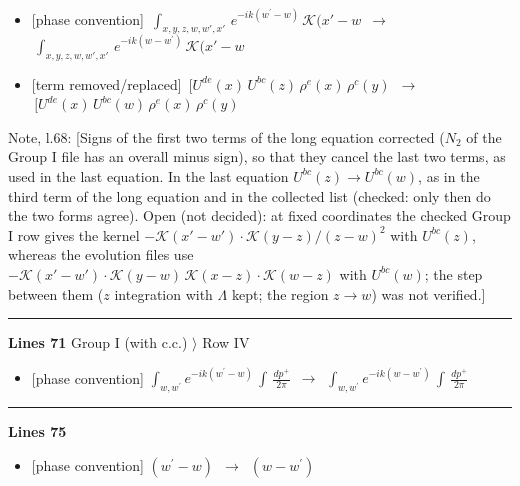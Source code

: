 \documentclass[10pt]{article}
\newenvironment{notebox}{\def\FrameCommand{{\color{notebar}\vrule width 1.5pt}\hspace{6pt}}\MakeFramed{\advance\hsize-\width\FrameRestore}\small}{\endMakeFramed}
\begin{document}
\begin{itemize}[leftmargin=2.2em,itemsep=1pt,topsep=2pt]
\item[\textbf{l.67}] \textsf{\small [phase convention]} $\displaystyle \,\int_{x,y,z,w,w',x'}\,e^{-ik(w^\prime-w)}\, \mathcal{K}(x'-w$\ $\longrightarrow$\ $\displaystyle \,\int_{x,y,z,w,w',x'}\,e^{-ik(w-w^\prime)}\, \mathcal{K}(x'-w$
\item[\textbf{l.67}] \textsf{\small [term removed/replaced]} $\displaystyle \,[U^{de}(x)\,U^{bc}(z)\, \rho^{e}(x)\,\rho^{c}(y)$\ $\longrightarrow$\ $\displaystyle \,[U^{de}(x)\,U^{bc}(w)\, \rho^{e}(x)\,\rho^{c}(y)$
\end{itemize}
\begin{notebox}\textsf{\small Note, l.68:} [Signs of the first two terms of the long equation corrected ($N_{2}$ of the Group I file has an overall minus sign), so that they cancel the last two terms, as used in the last equation. In the last equation $U^{bc}(z)\to U^{bc}(w)$, as in the third term of the long equation and in the collected list (checked: only then do the two forms agree). Open (not decided): at fixed coordinates the checked Group I row gives the kernel $-\mathcal{K}(x'-w')\cdot\mathcal{K}(y-z)/(z-w)^{2}$ with $U^{bc}(z)$, whereas the evolution files use $-\mathcal{K}(x'-w')\cdot\mathcal{K}(y-w)\,\mathcal{K}(x-z)\cdot\mathcal{K}(w-z)$ with $U^{bc}(w)$; the step between them ($z$ integration with $\Lambda$ kept; the region $z\to w$) was not verified.]\end{notebox}
\noindent\rule{\linewidth}{0.3pt}\par\noindent\textbf{Lines 71} \quad \textsf{Group I (with c.c.) $\rangle$ Row IV} \par
\begin{itemize}[leftmargin=2.2em,itemsep=1pt,topsep=2pt]
\item[\textbf{l.71}] \textsf{\small [phase convention]} $\displaystyle \int_{w, w^\prime} e^{-ik(w^\prime-w)}\, \int\,\frac{dp^{+}}{2\pi}$\ $\longrightarrow$\ $\displaystyle \int_{w, w^\prime} e^{-ik(w-w^\prime)}\, \int\,\frac{dp^{+}}{2\pi}$
\end{itemize}
\noindent\rule{\linewidth}{0.3pt}\par\noindent\textbf{Lines 75} \par
\begin{itemize}[leftmargin=2.2em,itemsep=1pt,topsep=2pt]
\item[\textbf{l.75}] \textsf{\small [phase convention]} $\displaystyle (w^\prime-w)$\ $\longrightarrow$\ $\displaystyle (w-w^\prime)$
\end{itemize}
\end{document}
